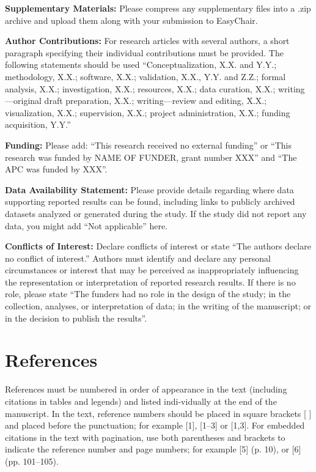 \documentclass[11pt,a4paper]{article}
\theoremstyle{plain}
\theoremstyle{definition}
\begin{document}
\vspace{1.5em}
{
\small
\setlength{\parskip}{0.8em}

\noindent \textbf{Supplementary Materials:} Please compress any supplementary files into a .zip archive and upload them along with your submission to EasyChair.

\noindent \textbf{Author Contributions:} For research articles with several authors, a short paragraph specifying their individual contributions must be provided. The following statements should be used ``Conceptualization, X.X. and Y.Y.; methodology, X.X.; software, X.X.; validation, X.X., Y.Y. and Z.Z.; formal analysis, X.X.; investigation, X.X.; resources, X.X.; data curation, X.X.; writing---original draft preparation, X.X.; writing---review and editing, X.X.; visualization, X.X.; supervision, X.X.; project administration, X.X.; funding acquisition, Y.Y.''

\noindent \textbf{Funding:} Please add: ``This research received no external funding'' or ``This research was funded by NAME OF FUNDER, grant number XXX'' and ``The APC was funded by XXX''.

\noindent \textbf{Data Availability Statement:} Please provide details regarding where data supporting reported results can be found, including links to publicly archived datasets analyzed or generated during the study. If the study did not report any data, you might add ``Not applicable'' here.

\noindent \textbf{Conflicts of Interest:} Declare conflicts of interest or state ``The authors declare no conflict of interest.'' Authors must identify and declare any personal circumstances or interest that may be perceived as inappropriately influencing the representation or interpretation of reported research results. If there is no role, please state ``The funders had no role in the design of the study; in the collection, analyses, or interpretation of data; in the writing of the manuscript; or in the decision to publish the results''.
\par
}

\section*{References}
References must be numbered in order of appearance in the text (including citations in tables and legends) and listed indi-vidually at the end of the manuscript. In the text, reference numbers should be placed in square brackets [ ] and placed before the punctuation; for example [1], [1--3] or [1,3]. For embedded citations in the text with pagination, use both parentheses and brackets to indicate the reference number and page numbers; for example [5] (p. 10), or [6] (pp. 101--105).
\end{document}
